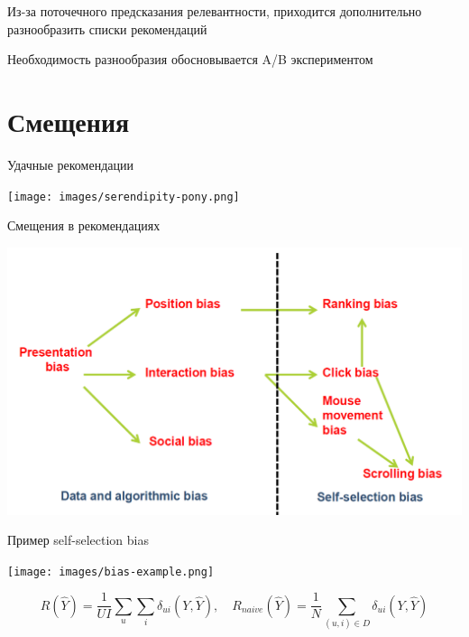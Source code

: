 \documentclass[11pt,aspectratio=169,handout]{beamer}
\begin{document}
\begin{frame}{}

\begin{tcolorbox}[colback=info!5,colframe=info!80,title=]
Из-за поточечного предсказания релевантности, приходится дополнительно разнообразить списки рекомендаций
\end{tcolorbox}

\begin{tcolorbox}[colback=info!5,colframe=info!80,title=]
Необходимость разнообразия обосновывается A/B экспериментом
\end{tcolorbox}

\end{frame}

\section{Смещения}

\begin{frame}{Удачные рекомендации}

\begin{center}
\texttt{[image: images/serendipity-pony.png]}
\end{center}

\end{frame}

\begin{frame}{Смещения в рекомендациях \cite{BIAS}}

\begin{center}
\includegraphics[scale=0.2]{images/bias.png}
\end{center}

\end{frame}

\begin{frame}{Пример self-selection bias}

\begin{center}
\texttt{[image: images/bias-example.png]}
\end{center}

\[
R(\hat Y) = \frac{1}{U I} \sum_u \sum_i \delta_{ui} (Y, \hat Y), \quad R_{naive}(\hat Y) = \frac{1}{N} \sum_{(u,i) \in D} \delta_{ui}(Y, \hat Y)
\]

\end{frame}
\end{document}
